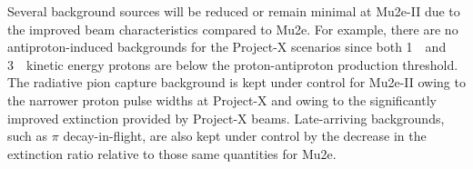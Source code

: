 

Several background sources will be reduced or remain minimal at
Mu2e-II due to the improved beam characteristics compared to Mu2e.
For example, there are no antiproton-induced backgrounds for the
Project-X scenarios since both 1~\gev\ and 3~\gev\ kinetic energy
protons are below the proton-antiproton production threshold.  The
radiative pion capture background is kept under control for Mu2e-II
owing to the narrower proton pulse widths at Project-X and owing to
the significantly improved extinction provided by Project-X beams.
Late-arriving backgrounds, such as $\pi$ decay-in-flight, are also
kept under control by the decrease in the extinction ratio relative to
those same quantities for Mu2e.
   
